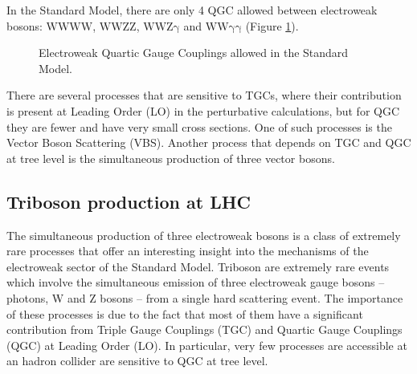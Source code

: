 In the Standard Model, there are only 4 QGC allowed between electroweak bosons: $\mathrm{WWWW}$, $\mathrm{WWZZ}$, $\mathrm{WWZ\gamma}$ and $\mathrm{WW\gamma\gamma}$ (Figure \ref{fig:EWQGC}).
\begin{figure}[ht]
  \centering
  \caption{Electroweak Quartic Gauge Couplings allowed in the Standard Model.}
  \label{fig:EWQGC}
\end{figure}

There are several processes that are sensitive to TGCs, where their contribution is present at Leading Order (LO) in the perturbative calculations,
but for QGC they are fewer and have very small cross sections.
One of such processes is the Vector Boson Scattering (VBS).
Another process that depends on TGC and QGC at tree level is the simultaneous production of three vector bosons.

\subsection{Triboson production at LHC}
The simultaneous production of three electroweak bosons is a class of extremely rare processes that offer an interesting insight into the mechanisms of the electroweak sector of the Standard Model.
Triboson are extremely rare events which involve the simultaneous emission of three electroweak gauge bosons -- photons, W and Z bosons -- from a single hard scattering event.
The importance of these processes is due to the fact that most of them have a significant contribution from Triple Gauge Couplings (TGC) and Quartic Gauge Couplings (QGC) at Leading Order (LO).
In particular, very few processes are accessible at an hadron collider are sensitive to QGC at tree level.

